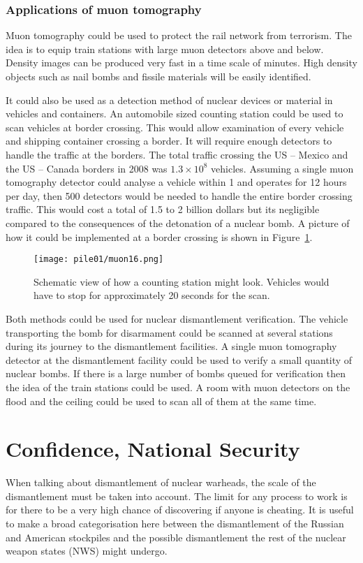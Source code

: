 \documentclass[twoside,titlepage,11pt,twocolumn,a4paper]{article}
\begin{document}
\subsubsection{Applications of muon tomography}
Muon tomography could be used to protect the rail network from
terrorism. The idea is to equip train stations with large muon
detectors above and below. Density images can be produced very fast in
a time scale of minutes. High density objects such as nail bombs and
fissile materials will be easily identified. \citep{nichol}

It could also be used as a detection method of nuclear devices or
material in vehicles and containers.  An automobile sized counting
station could be used to scan vehicles at border crossing. This would
allow examination of every vehicle and shipping container crossing a
border. It will require enough detectors to handle the traffic at the
borders. The total traffic crossing the US -- Mexico and the US --
Canada borders in 2008 was \(1.3\times10^8\) vehicles. Assuming a
single muon tomography detector could analyse a vehicle within
\unit{1}{\minute} and operates for 12 hours per day, then 500
detectors would be needed to handle the entire border crossing
traffic. This would cost a total of 1.5 to 2 billion dollars but its
negligible compared to the consequences of the detonation of a nuclear
bomb. A picture of how it could be implemented at a border crossing is
shown in Figure~\ref{fig:muon16}. \citep{morris2008}

\begin{figure}
  \texttt{[image: pile01/muon16.png]}
  \caption{Schematic view of how a counting station might
    look. Vehicles would have to stop for approximately 20 seconds for
    the scan. \citep{morris2008}}
  \label{fig:muon16}
\end{figure}

Both methods could be used for nuclear dismantlement verification. The
vehicle transporting the bomb for disarmament could be scanned at
several stations during its journey to the dismantlement facilities. A
single muon tomography detector at the dismantlement facility could be
used to verify a small quantity of nuclear bombs. If there is a large
number of bombs queued for verification then the idea of the train
stations could be used. A room with muon detectors on the flood and
the ceiling could be used to scan all of them at the same time.

\section{Confidence, National Security}
When talking about dismantlement of nuclear warheads, the scale of the
dismantlement must be taken into account. The limit for any process to
work is for there to be a very high chance of discovering if anyone is
cheating. It is useful to make a broad categorisation here between the
dismantlement of the Russian and American stockpiles and the possible
dismantlement the rest of the nuclear weapon states (NWS) might
undergo.
\end{document}
